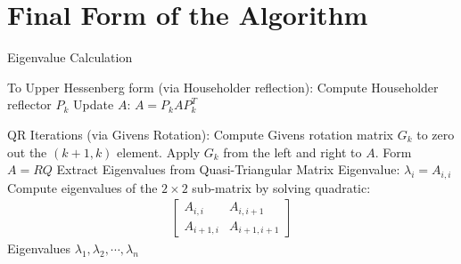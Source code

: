 
\chapter{Final Form of the Algorithm} %

\label{Chapter6}



\begin{algorithm}
\caption{Eigenvalue Calculation}
\begin{algorithmic}
\STATE To Upper Hessenberg form (via Householder reflection):
        \STATE Compute Householder reflector $P_k$ 
        \STATE Update $A$: $A = P_k A P_k^T$
    \ENDFOR

\STATE QR Iterations (via Givens Rotation):
            \STATE Compute Givens rotation matrix $G_k$ to zero out the $(k+1, k)$ element.
            \STATE Apply $G_k$ from the left and right to $A$.
        \ENDFOR
    \STATE Form $A = R Q$
\ENDWHILE
\STATE Extract Eigenvalues from Quasi-Triangular Matrix
            \STATE Eigenvalue: $\lambda_i = A_{i, i}$
        \ELSE
            \STATE Compute eigenvalues of the $2 \times 2$ sub-matrix by solving quadratic:
            \begin{align*}
            \begin{bmatrix}
                A_{i, i} & A_{i, i+1} \\
                A_{i+1, i} & A_{i+1, i+1}
            \end{bmatrix}
            \end{align*}
        \ENDIF
    \ENDFOR
\RETURN Eigenvalues $\lambda_1, \lambda_2,\cdots, \lambda_n$
\end{algorithmic}
\end{algorithm}







